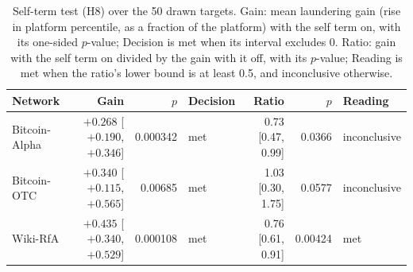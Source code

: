 \begin{table}[!t]
\centering
\scriptsize
\setlength{\tabcolsep}{3pt}
\caption{Self-term test (H8) over the 50 drawn targets. Gain: mean laundering gain (rise in platform percentile, as a fraction of the platform) with the self term on, with its one-sided $p$-value; Decision is met when its interval excludes 0. Ratio: gain with the self term on divided by the gain with it off, with its $p$-value; Reading is met when the ratio's lower bound is at least 0.5, and inconclusive otherwise.}
\label{tab:s_s_self_term_h8}
\begin{tabular}{@{}lrrlrrl@{}}
\toprule
\textbf{Network} & \textbf{Gain} & \textbf{$p$} & \textbf{Decision} & \textbf{Ratio} & \textbf{$p$} & \textbf{Reading} \\
\midrule
Bitcoin-Alpha & $+0.268$ [$+0.190$, $+0.346$] & 0.000342 & met & 0.73 [0.47, 0.99] & 0.0366 & inconclusive \\
Bitcoin-OTC & $+0.340$ [$+0.115$, $+0.565$] & 0.00685 & met & 1.03 [0.30, 1.75] & 0.0577 & inconclusive \\
Wiki-RfA & $+0.435$ [$+0.340$, $+0.529$] & 0.000108 & met & 0.76 [0.61, 0.91] & 0.00424 & met \\
\bottomrule
\end{tabular}
\end{table}

